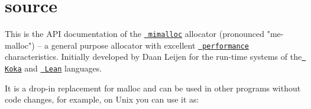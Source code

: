 \chapter{source}
\hypertarget{index}{}\label{index}
This is the API documentation of the \href{https://github.com/microsoft/mimalloc}{\texttt{ mimalloc}} allocator (pronounced "{}me-\/malloc"{}) -- a general purpose allocator with excellent \href{bench.html}{\texttt{ performance}} characteristics. Initially developed by Daan Leijen for the run-\/time systems of the \href{https://github.com/koka-lang/koka}{\texttt{ Koka}} and \href{https://github.com/leanprover/lean}{\texttt{ Lean}} languages.

It is a drop-\/in replacement for {\ttfamily malloc} and can be used in other programs without code changes, for example, on Unix you can use it as\+: 
\begin{DoxyCode}{0}

\end{DoxyCode}


